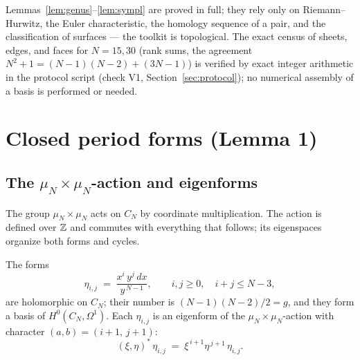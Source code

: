 \begin{statusbox}
Lemmas~\ref{lem:genus}--\ref{lem:sympl} are proved in full; they rely
only on Riemann--Hurwitz, the Euler characteristic, the homology
sequence of a pair, and the classification of surfaces --- the
toolkit is topological. The exact census of sheets, edges, and faces
for $N=15,30$ (rank sums, the agreement
$N^2+1=(N-1)(N-2)+(3N-1)$) is verified by exact integer arithmetic
in the protocol script (check V1, Section~\ref{sec:protocol}); no
numerical assembly of a basis is performed or needed.
\end{statusbox}

\section{Closed period forms (Lemma 1)}\label{sec:periods}

\subsection{The $\mu_N\times\mu_N$-action and eigenforms}

The group $\mu_N\times\mu_N$ acts on $C_N$ by coordinate
multiplication. The action is defined over $\mathbb{Z}$ and commutes with
everything that follows; its eigenspaces organize both forms and
cycles.

\begin{lemma}\label{lem:forms}
The forms
\[
  \eta_{i,j} \;=\; \frac{x^i\,y^j\,dx}{y^{\,N-1}},
  \qquad i,j\ge 0,\quad i+j\le N-3,
\]
are holomorphic on $C_N$; their number is $(N-1)(N-2)/2=g$, and they
form a basis of $H^0(C_N,\Omega^1)$. Each $\eta_{i,j}$ is an
eigenform of the $\mu_N\times\mu_N$-action with character
$(a,b)=(i+1,\,j+1)$:
\begin{equation}\label{eq:eigen}
  (\xi,\eta)^*\,\eta_{i,j} \;=\; \xi^{\,i+1}\eta^{\,j+1}\,\eta_{i,j}.
\end{equation}
\end{lemma}

